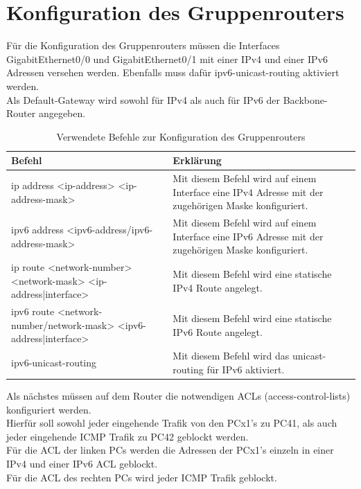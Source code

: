 \documentclass{article}
\begin{document}
\pagebreak



\section{Konfiguration des Gruppenrouters}

Für die Konfiguration des Gruppenrouters müssen die Interfaces GigabitEthernet0/0 und GigabitEthernet0/1 mit einer IPv4 und einer IPv6 Adressen versehen werden. Ebenfalls muss dafür ipv6-unicast-routing aktiviert werden.\\
Als Default-Gateway wird sowohl für IPv4 als auch für IPv6 der Backbone-Router angegeben.\\


\begin{table}[htbp]
    \centering
    \begin{tabularx}{\textwidth}{|X|X|}
        \toprule
        \textbf{Befehl} & \textbf{Erklärung} \\
        \midrule
        ip address <ip-address> <ip-address-mask> & Mit diesem Befehl wird auf einem Interface eine IPv4 Adresse mit der zugehörigen Maske konfiguriert.\\
        \hline
        ipv6 address <ipv6-address/ipv6-address-mask> & Mit diesem Befehl wird auf einem Interface eine IPv6 Adresse mit der zugehörigen Maske konfiguriert.\\
        \hline
        ip route <network-number> <network-mask> <ip-address|interface> & Mit diesem Befehl wird eine statische IPv4 Route angelegt.\\
        \hline
        ipv6 route <network-number/network-mask> <ipv6-address|interface> & Mit diesem Befehl wird eine statische IPv6 Route angelegt.\\
        \hline
        ipv6-unicast-routing & Mit diesem Befehl wird das unicast-routing für IPv6 aktiviert.\\
        \bottomrule
    \end{tabularx}
    \caption{Verwendete Befehle zur Konfiguration des Gruppenrouters}
\end{table}

\noindent Als nächstes müssen auf dem Router die notwendigen ACLs (access-control-lists) konfiguriert werden.\\
Hierfür soll sowohl jeder eingehende Trafik von den PCx1's zu PC41, als auch jeder eingehende ICMP Trafik zu PC42 geblockt werden.\\
Für die ACL der linken PCs werden die Adressen der PCx1's einzeln in einer IPv4 und einer IPv6 ACL geblockt.\\
Für die ACL des rechten PCs wird jeder ICMP Trafik geblockt.\\
\end{document}

